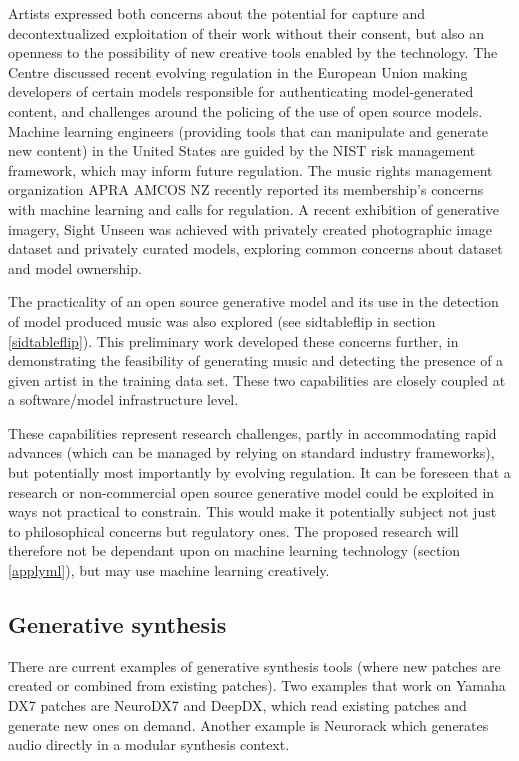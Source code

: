 \documentclass[10pt]{article}
\begin{document}
\begin{multicols*}{2}
Artists expressed both concerns about the potential for capture and decontextualized exploitation of their work without their consent\cite{datacollect}, but also an openness to the possibility of new creative tools enabled by the technology\cite{creativityai}. The Centre discussed recent evolving regulation in the European Union making developers of certain models responsible for authenticating model-generated content\cite{euairegs}, and challenges around the policing of the use of open source models. Machine learning engineers (providing tools that can manipulate and generate new content) in the United States are guided by the NIST risk management framework\cite{nistai}, which may inform future regulation. The music rights management organization APRA AMCOS NZ recently reported its membership's concerns with machine learning and calls for regulation\cite{aprastory}. A recent exhibition of generative imagery, Sight Unseen\cite{sightunseen} was achieved with privately created photographic image dataset and privately curated models, exploring common concerns about dataset and model ownership. 

The practicality of an open source generative model and its use in the detection of model produced music was also explored (see sidtableflip in section \ref{sidtableflip}). This preliminary work developed these concerns further, in demonstrating the feasibility of generating music and detecting the presence of a given artist in the training data set. These two capabilities are closely coupled at a software/model infrastructure level.

These capabilities represent research challenges, partly in accommodating rapid advances (which can be managed by relying on standard industry frameworks), but potentially most importantly by evolving regulation. It can be foreseen that a research or non-commercial open source generative model could be exploited in ways not practical to constrain. This would make it potentially subject not just to philosophical concerns but regulatory ones. The proposed research will therefore not be dependant upon on machine learning technology (section \ref{applyml}), but may use machine learning creatively.

\subsection{Generative synthesis}
\label{gensynth}

There are current examples of generative synthesis tools (where new patches are created or combined from existing patches). Two examples that work on Yamaha DX7 patches are NeuroDX7\cite{neurodx7} and DeepDX\cite{deepdx}, which read existing patches and generate new ones on demand. Another example is Neurorack\cite{neurorack} which generates audio directly in a modular synthesis context.


\end{multicols*}
\end{document}
